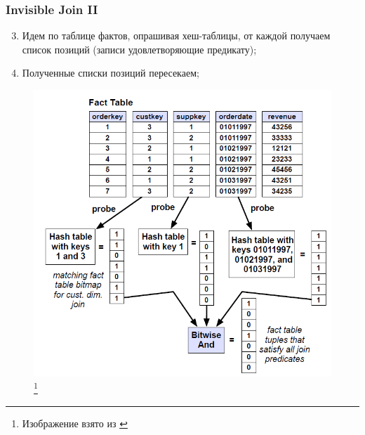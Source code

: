 \documentclass{beamer}
\begin{document}
\begin{frame}
\frametitle{Invisible Join II}

\begin{enumerate}
  \setcounter{enumi}{2}
  \item Идем по таблице фактов, опрашивая хеш-таблицы, от каждой получаем список позиций (записи удовлетворяющие предикату);
  \item Полученные списки позиций пересекаем;
\end{enumerate}

\begin{figure}[htb]
\includegraphics[width=\textwidth,height=0.650\textheight,keepaspectratio]{i2.png} 
\footnote{\tiny{Изображение взято из \cite{Abadi2008}}}
\end{figure}   

\end{frame}
\end{document}
